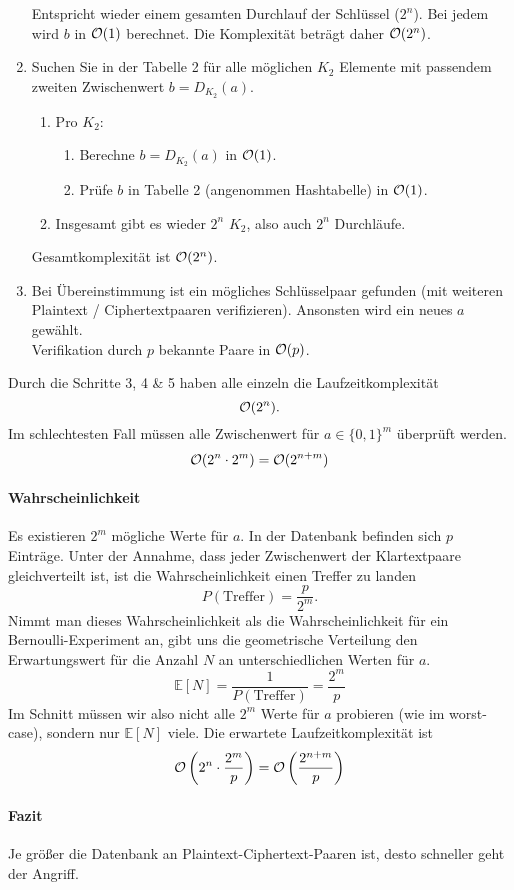 \begin{enumerate}
          Entspricht wieder einem gesamten Durchlauf der Schlüssel ($2^n$). Bei jedem wird
          $b$ in $\mathcal{O}(1)$ berechnet. Die Komplexität beträgt daher $\mathcal{O}(2^n)$.
    \item Suchen Sie in der Tabelle 2 für alle möglichen $K_2$ Elemente mit
          passendem zweiten Zwischenwert $b = D_{K_2} (a)$.
          \begin{enumerate}
            \item Pro $K_2$:
            \begin{enumerate}
                \item Berechne $b = D_{K_2}(a)$ in $\mathcal{O}(1)$.
                \item Prüfe $b$ in Tabelle 2 (angenommen Hashtabelle) in $\mathcal{O}(1)$.
            \end{enumerate}
            \item Insgesamt gibt es wieder $2^n$ $K_2$, also auch $2^n$ Durchläufe.
          \end{enumerate}
          Gesamtkomplexität ist $\mathcal{O}(2^n)$.
    \item Bei Übereinstimmung ist ein mögliches Schlüsselpaar gefunden
          (mit weiteren Plaintext / Ciphertextpaaren verifizieren). Ansonsten
          wird ein neues $a$ gewählt.\vspace*{1em}\\
          Verifikation durch $p$ bekannte Paare in $\mathcal{O}(p)$.
\end{enumerate}
Durch die Schritte 3, 4 \& 5 haben alle einzeln die Laufzeitkomplexität
\[
    \mathcal{O}(2^n).
\]
Im schlechtesten Fall müssen alle Zwischenwert für $a\in\{0,1\}^m$ überprüft werden.
\[
    \mathcal{O}(2^n\cdot 2^m) = \mathcal{O}(2^{n + m})
\]
\paragraph{Wahrscheinlichkeit} Es existieren $2^m$ mögliche Werte für $a$. In 
der Datenbank befinden sich $p$ Einträge. Unter der Annahme, dass jeder
Zwischenwert der Klartextpaare gleichverteilt ist, ist die Wahrscheinlichkeit einen
Treffer zu landen 
\[
    P(\text{Treffer})=\frac{p}{2^m}.
\]
Nimmt man dieses Wahrscheinlichkeit als die Wahrscheinlichkeit für ein Bernoulli-Experiment an,
gibt uns die geometrische Verteilung den Erwartungswert für die Anzahl $N$ an unterschiedlichen
Werten für $a$.
\[
    \mathbb{E}[N] = \frac{1}{P(\text{Treffer})} = \frac{2^m}{p}
\]
Im Schnitt müssen wir also nicht alle $2^m$ Werte für $a$ probieren (wie im worst-case),
sondern nur $\mathbb{E}[N]$ viele. Die erwartete Laufzeitkomplexität ist
\[
    \mathcal{O}\left(2^n\cdot \frac{2^m}{p}\right) = \mathcal{O}\left(\frac{2^{n + m}}{p}\right) 
\]
\paragraph{Fazit}
Je größer die Datenbank an Plaintext-Ciphertext-Paaren ist, desto schneller geht der Angriff.
